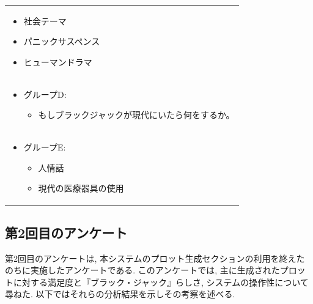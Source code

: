 \documentclass[a4j,12pt]{jsreport}
\begin{document}
\begin{tabularx}{12cm}{X}
\begin{minipage}{\linewidth}
\begin{itemize}[itemsep=0pt, parsep=2pt]
               \begin{itemize}[itemsep=0pt, parsep=5pt]
                  \item 社会テーマ
                  \item パニックサスペンス
                  \item ヒューマンドラマ
               \end{itemize}
         \end{itemize}
   \end{minipage} \\
   \begin{minipage}{\linewidth}
      \vspace{0.5cm}
         \begin{itemize}[itemsep=0pt, parsep=2pt]
            \item グループD:
               \begin{itemize}[itemsep=0pt, parsep=5pt]
                  \item もしブラックジャックが現代にいたら何をするか。
               \end{itemize}
         \end{itemize}
   \end{minipage} \\
   \begin{minipage}{\linewidth}
      \vspace{0.5cm}
         \begin{itemize}[itemsep=0pt, parsep=2pt]
            \item グループE:
               \begin{itemize}[itemsep=0pt, parsep=5pt]
                  \item 人情話
                  \item 現代の医療器具の使用
               \end{itemize}
         \end{itemize}
         \vspace{0.5cm}
   \end{minipage} \\
   \hline
\end{tabularx}

\subsection{第2回目のアンケート}\label{after}
第2回目のアンケートは, 本システムのプロット生成セクションの利用を終えたのちに実施したアンケートである. このアンケートでは, 主に生成されたプロットに対する満足度と『ブラック・ジャック』らしさ, システムの操作性について尋ねた. 以下ではそれらの分析結果を示しその考察を述べる.
\end{document}

